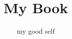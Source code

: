 \documentclass[11pt]{book}
\begin{document}
\title{My Book}
\author{my good self}
\date{}
\maketitle
\end{document}
